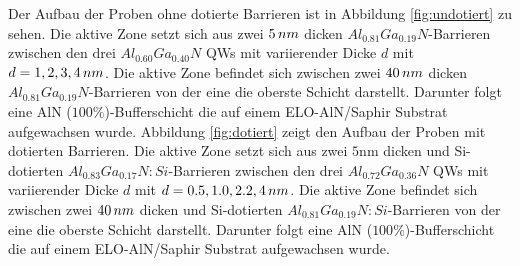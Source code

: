 \noindent 
Der Aufbau der Proben ohne dotierte Barrieren ist in Abbildung \ref{fig:undotiert} zu sehen.
Die aktive Zone setzt sich aus zwei $5 \thinspace nm$ dicken $ Al_{0.81}Ga_{0.19}N$-Barrieren zwischen den drei $ Al_{0.60}Ga_{0.40}N$ QWs mit variierender Dicke $d$ mit $d=1,2,3,4 \thinspace nm$. Die aktive Zone befindet sich zwischen zwei $40 \thinspace nm$ dicken $ Al_{0.81}Ga_{0.19}N$-Barrieren von der eine die oberste Schicht darstellt. Darunter folgt eine AlN ($100\%$)-Bufferschicht die auf einem ELO-AlN/Saphir Substrat aufgewachsen wurde. 
\newline
Abbildung \ref{fig:dotiert} zeigt den Aufbau der Proben mit dotierten Barrieren. Die aktive Zone setzt sich aus zwei $5$nm dicken und Si-dotierten $ Al_{0.83}Ga_{0.17}N:Si$-Barrieren zwischen den drei $ Al_{0.72}Ga_{0.36}N$ QWs mit variierender Dicke $d$ mit $d=0.5,1.0,2.2,4 \thinspace nm$. Die aktive Zone befindet sich zwischen zwei $40 \thinspace nm$ dicken und Si-dotierten $ Al_{0.81}Ga_{0.19}N:Si$-Barrieren von der eine die oberste Schicht darstellt. Darunter folgt eine AlN ($100\%$)-Bufferschicht die auf einem ELO-AlN/Saphir Substrat aufgewachsen wurde. 
